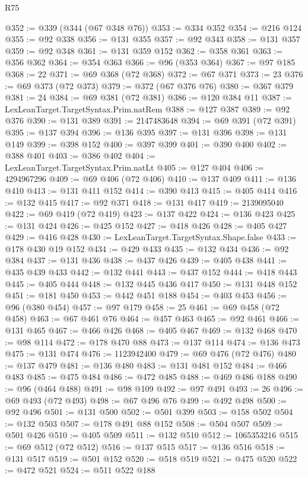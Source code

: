 \begin{lexlean}{R75}
\begin{coremodule}
@352 := @339 (@344 (@67 @348 @76))
@353 := @334 @352
@354 := @216 @124
@355 := @92 @338
@356 := @131 @355
@357 := @92 @343
@358 := @131 @357
@359 := @92 @348
@361 := @131 @359 @152
@362 := @358 @361
@363 := @356 @362
@364 := @354 @363
@366 := @96 (@353 @364)
@367 := @97 @185
@368 := 22
@371 := @69 @368 (@72 @368)
@372 := @67 @371
@373 := 23
@376 := @69 @373 (@72 @373)
@379 := @372 (@67 @376 @76)
@380 := @367 @379
@381 := 24
@384 := @69 @381 (@72 @381)
@386 := @120 @384 @11
@387 := LexLeanTarget.TargetSyntax.Prim.natRem
@388 := @127 @387
@389 := @92 @376
@390 := @131 @389
@391 := 2147483648
@394 := @69 @391 (@72 @391)
@395 := @137 @394
@396 := @136 @395
@397 := @131 @396
@398 := @131 @149
@399 := @398 @152
@400 := @397 @399
@401 := @390 @400
@402 := @388 @401
@403 := @386 @402
@404 := LexLeanTarget.TargetSyntax.Prim.natLt
@405 := @127 @404
@406 := 4294967296
@409 := @69 @406 (@72 @406)
@410 := @137 @409
@411 := @136 @410
@413 := @131 @411 @152
@414 := @390 @413
@415 := @405 @414
@416 := @132 @415
@417 := @92 @371
@418 := @131 @417
@419 := 2139095040
@422 := @69 @419 (@72 @419)
@423 := @137 @422
@424 := @136 @423
@425 := @131 @424
@426 := @425 @152
@427 := @418 @426
@428 := @405 @427
@429 := @416 @428
@430 := LexLeanTarget.TargetSyntax.Shape.false
@433 := @178 @430 @19 @152
@434 := @429 @433
@435 := @132 @434
@436 := @92 @384
@437 := @131 @436
@438 := @437 @426
@439 := @405 @438
@441 := @435 @439 @433
@442 := @132 @441
@443 := @437 @152
@444 := @418 @443
@445 := @405 @444
@448 := @132 @445 @436 @417
@450 := @131 @448 @152
@451 := @181 @450
@453 := @442 @451 @188
@454 := @403 @453
@456 := @96 (@380 @454)
@457 := @97 @179
@458 := 25
@461 := @69 @458 (@72 @458)
@463 := @67 @461 @76
@464 := @457 @463
@465 := @92 @461
@466 := @131 @465
@467 := @466 @426
@468 := @405 @467
@469 := @132 @468
@470 := @98 @114
@472 := @178 @470 @88
@473 := @137 @114
@474 := @136 @473
@475 := @131 @474
@476 := 1123942400
@479 := @69 @476 (@72 @476)
@480 := @137 @479
@481 := @136 @480
@483 := @131 @481 @152
@484 := @466 @483
@485 := @475 @484
@486 := @472 @485
@488 := @469 @486 @188
@490 := @96 (@464 @488)
@491 := @98 @109
@492 := @97 @491
@493 := 26
@496 := @69 @493 (@72 @493)
@498 := @67 @496 @76
@499 := @492 @498
@500 := @92 @496
@501 := @131 @500
@502 := @501 @399
@503 := @158 @502
@504 := @132 @503
@507 := @178 @491 @88 @152
@508 := @504 @507
@509 := @501 @426
@510 := @405 @509
@511 := @132 @510
@512 := 1065353216
@515 := @69 @512 (@72 @512)
@516 := @137 @515
@517 := @136 @516
@518 := @131 @517
@519 := @501 @152
@520 := @518 @519
@521 := @475 @520
@522 := @472 @521
@524 := @511 @522 @188

\end{coremodule}
\end{lexlean}
